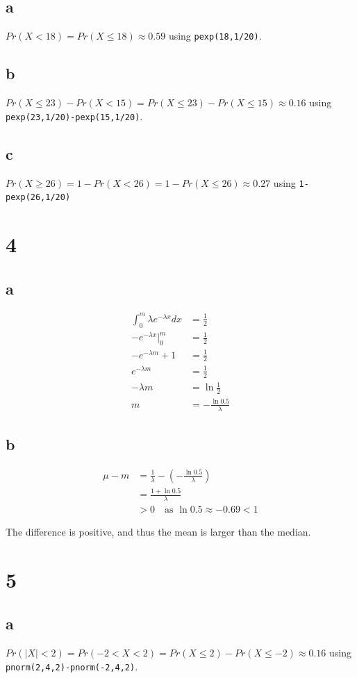\documentclass[10pt]{article}
\begin{document}
\subsection*{a}
$Pr(X<18)=Pr(X\le18)\approx0.59$ using \texttt{pexp(18,1/20)}.
\subsection*{b}
$Pr(X\le23)-Pr(X<15)=Pr(X\le23)-Pr(X\le15)\approx0.16$ using \texttt{pexp(23,1/20)-pexp(15,1/20)}.\
\subsection*{c}
$Pr(X\ge26)=1-Pr(X<26)=1-Pr(X\le26)\approx0.27$ using \texttt{1-pexp(26,1/20)}

\section*{4}
\subsection*{a}
\begin{align*}
    \int_0^m\lambda e^{-\lambda x}dx &= \frac{1}{2}\\
    -e^{-\lambda x}\Bigr |_0^m &= \frac{1}{2}\\
    -e^{-\lambda m}+1&=\frac{1}{2}\\
    e^{-\lambda m} &= \frac{1}{2}\\
    -\lambda m &= \ln\frac{1}{2}\\
    m&=-\frac{\ln 0.5}{\lambda}
\end{align*}

\subsection*{b}
\begin{align*}
    \mu-m&=\frac{1}{\lambda} - (-\frac{\ln 0.5}{\lambda})\\
    &= \frac{1+\ln0.5}{\lambda}\\
    &> 0 \quad \text{as } \ln 0.5 \approx -0.69<1
\end{align*}

The difference is positive, and thus the mean is larger than the median.

\section*{5}
\subsection*{a}
$Pr(|X|<2)=Pr(-2<X<2)=Pr(X\le2)-Pr(X\le-2)\approx0.16$ using \texttt{pnorm(2,4,2)-pnorm(-2,4,2)}.
\end{document}
